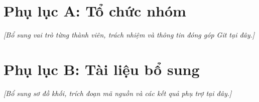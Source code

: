 \newpage
\appendix
\section{Phụ lục A: Tổ chức nhóm}
\textit{[Bổ sung vai trò từng thành viên, trách nhiệm và thông tin đóng góp Git tại đây.]}

\newpage
\section{Phụ lục B: Tài liệu bổ sung}
\textit{[Bổ sung sơ đồ khối, trích đoạn mã nguồn và các kết quả phụ trợ tại đây.]}